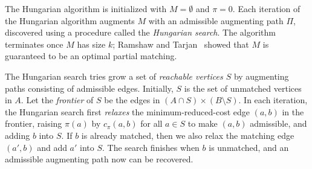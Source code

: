 \documentclass[a4paper,UKenglish]{socg-lipics-v2018}
\makeatletter
\def\note#1{\textcolor{red}{{#1}}}
\theoremstyle{plain}
\numberwithin{figure}{section}
\def\EMPH#1{\textcolor{BrickRed}{{\emph{#1}}}}
\def\n@te#1{\textsf{\boldmath \textbf{$\langle\!\langle$#1$\rangle\!\rangle$}}\leavevmode}
\def\note#1{\textcolor{red}{\n@te{#1}}}
\makeatother
\begin{document}
The Hungarian algorithm is initialized with $M = \emptyset$ and $\pi = 0$.
Each iteration of the Hungarian algorithm augments $M$ with an admissible
augmenting path $\Pi$, discovered using a procedure called the
\EMPH{Hungarian search}.
The algorithm terminates once $M$ has size $k$;
Ramshaw and Tarjan~\cite{RT12} showed that $M$ is guaranteed to be an optimal partial matching.

The Hungarian search tries grow a set of \EMPH{reachable vertices $S$}
by augmenting paths consisting of admissible edges.
Initially, $S$ is the set of unmatched vertices in $A$.
Let the \EMPH{frontier} of $S$ be the edges in $(A \cap S) \times (B \setminus S)$.
In each iteration, the Hungarian search first \EMPH{relaxes} the
minimum-reduced-cost edge $(a, b)$ in the frontier, raising
$\pi(a)$ by $c_\pi(a, b)$ for all $a \in S$ to make $(a, b)$
admissible, and adding $b$ into $S$.
%
If $b$ is already matched, then we also relax the matching edge $(a',b)$ and add $a'$ into $S$.
The search finishes when $b$ is unmatched, and an admissible augmenting path now can be recovered.
\end{document}
